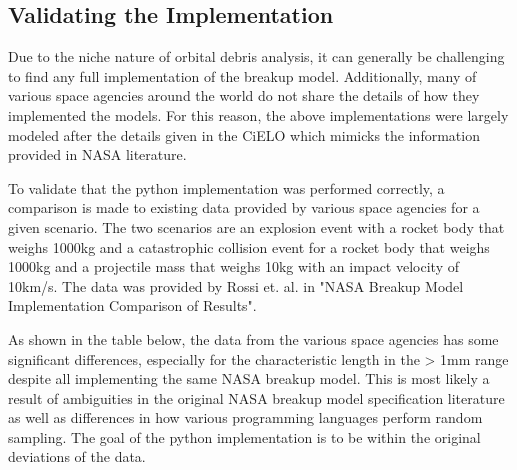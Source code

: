 \documentclass[a4paper, 12pt]{article}
\begin{document}
\newpage
\subsection{Validating the Implementation}
Due to the niche nature of orbital debris analysis, it can generally be challenging to find any full implementation of the breakup model. Additionally, many of various space agencies around the world do not share the details of how they implemented the models. For this reason, the above implementations were largely modeled after the details given in the CiELO \cite{letizia_space_2016} which mimicks the information provided in NASA literature.

To validate that the python implementation was performed correctly, a comparison is made to existing data provided by various space agencies for a given scenario. The two scenarios are an explosion event with a rocket body that weighs 1000kg and a catastrophic collision event for a rocket body that weighs 1000kg and a projectile mass that weighs 10kg with an impact velocity of 10km/s. The data was provided by Rossi et. al. in "NASA Breakup Model Implementation Comparison of Results"\citep{rossi_nasa_nodate}.

As shown in the table below, the data from the various space agencies has some significant differences, especially for the characteristic length in the > 1mm range despite all implementing the same NASA breakup model. This is most likely a result of ambiguities in the original NASA breakup model specification literature as well as differences in how various programming languages perform random sampling. The goal of the python implementation is to be within the original deviations of the data.
\end{document}
